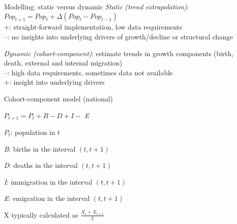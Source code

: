 \documentclass[final, 12pt, aspectratio=169, xcolor={dvipsnames}]{beamer}
\begin{document}
\begin{frame}{Modelling: static versus dynamic}
  \textit{Static (trend extrapolation)}: $Pop_{t+1} = Pop_{t} + \Delta (Pop_{t} - Pop_{t-1})$\\

    +: straight-forward implementation, low data requirements \\
    --: no insights into underlying drivers of growth/decline or structural change
    
 \textit{Dynamic (cohort-component)}: estimate trends in growth components (birth, death, external and internal migration)     \\

 --: high data requirements, sometimes data not available \\
 +: insight into underlying drivers
\end{frame}


\begin{frame}{Cohort-component model (national)}
  
    $P_{t+1} = P_{t} + B - D + I - $ \textit{E}
    
  \begin{description}
  \item \textit{$P_{t}$}: population in $t$ \\
  \item \textit{B}: births in the interval $(t, t+1 )$ \\
  \item \textit{D}: deaths in the interval $(t, t+1 )$ \\
  \item \textit{I}: immigration in the interval $(t, t+1 )$ \\
  \item \textit{E}: emigration in the interval $(t, t+1 )$
  \end{description}
\vspace{1cm}
  X typically calculated as $\frac{X_{t} + X_{t+1}}{2}$
  
\end{frame}
\end{document}
